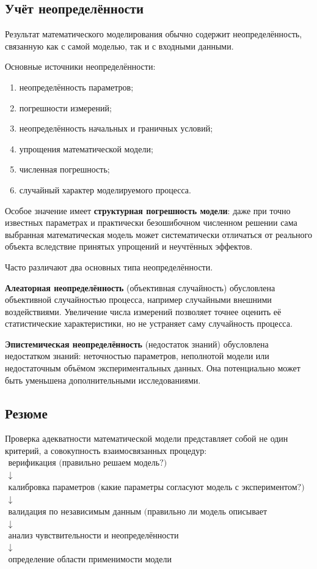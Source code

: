 \subsection{Учёт неопределённости}

Результат математического моделирования обычно содержит неопределённость, связанную как с самой моделью, так и с входными данными.

Основные источники неопределённости:
\begin{enumerate}
	\item неопределённость параметров;
	\item погрешности измерений;
	\item неопределённость начальных и граничных условий;
	\item упрощения математической модели;
	\item численная погрешность;
	\item случайный характер моделируемого процесса.
\end{enumerate}

Особое значение имеет \textbf{структурная погрешность модели}: даже при точно известных параметрах и практически безошибочном численном решении сама выбранная математическая модель может систематически отличаться от реального объекта вследствие принятых упрощений и неучтённых эффектов.

Часто различают два основных типа неопределённости.

\textbf{Алеаторная неопределённость} (объективная случайность) обусловлена объективной случайностью процесса, например случайными внешними воздействиями. Увеличение числа измерений позволяет точнее оценить её статистические характеристики, но не устраняет саму случайность процесса.

\textbf{Эпистемическая неопределённость} (недостаток знаний) обусловлена недостатком знаний: неточностью параметров, неполнотой модели или недостаточным объёмом экспериментальных данных. Она потенциально может быть уменьшена дополнительными исследованиями.

\subsection{Резюме}

Проверка адекватности математической модели представляет собой не один критерий, а совокупность взаимосвязанных процедур:
\[
\boxed{
	\begin{array}{c}
		\text{верификация (правильно решаем модель?)}
		\\
		\downarrow
		\\
		\text{калибровка параметров (какие параметры согласуют модель с экспериментом?)}
		\\
		\downarrow
		\\
		\text{валидация по независимым данным (правильно ли модель описывает реальность?)}
		\\
		\downarrow
		\\
		\text{анализ чувствительности и неопределённости}
		\\
		\downarrow
		\\
		\text{определение области применимости модели}
	\end{array}
}
\]

